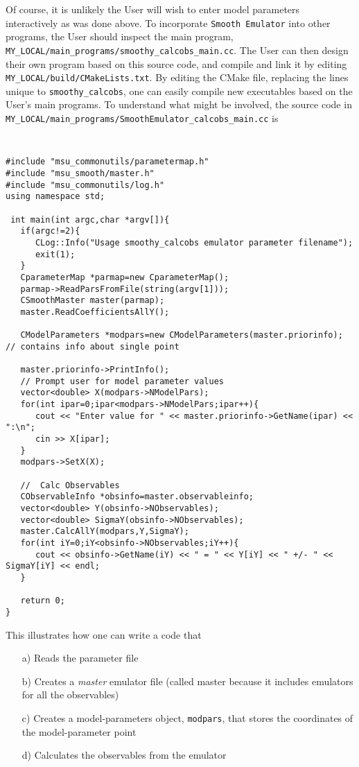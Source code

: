 \documentclass[UserManual.tex]{subfiles}
\begin{document}
Of course, it is unlikely the User will wish to enter model parameters interactively as was done above. To incorporate {\tt Smooth Emulator} into other programs, the User should inspect the main program, {\tt MY\_LOCAL/main\_programs/smoothy\_calcobs\_main.cc}. The User can then design their own program based on this source code, and compile and link it by editing {\tt MY\_LOCAL/build/CMakeLists.txt}. By editing the CMake file, replacing the lines unique to {\tt smoothy\_calcobs}, one can easily compile new executables based on the User's main programs. To understand what might be involved, the source code in {\tt MY\_LOCAL/main\_programs/SmoothEmulator\_calcobs\_main.cc} is
{\tt
\begin{verbatim}
#include "msu_commonutils/parametermap.h"
#include "msu_smooth/master.h"
#include "msu_commonutils/log.h"
using namespace std;

 int main(int argc,char *argv[]){
   if(argc!=2){
      CLog::Info("Usage smoothy_calcobs emulator parameter filename");
      exit(1);
   }
   CparameterMap *parmap=new CparameterMap();
   parmap->ReadParsFromFile(string(argv[1]));
   CSmoothMaster master(parmap);
   master.ReadCoefficientsAllY();
   
   CModelParameters *modpars=new CModelParameters(master.priorinfo); // contains info about single point
   
   master.priorinfo->PrintInfo();
   // Prompt user for model parameter values
   vector<double> X(modpars->NModelPars);
   for(int ipar=0;ipar<modpars->NModelPars;ipar++){
      cout << "Enter value for " << master.priorinfo->GetName(ipar) << ":\n";
      cin >> X[ipar];
   }
   modpars->SetX(X);
   
   //  Calc Observables
   CObservableInfo *obsinfo=master.observableinfo;
   vector<double> Y(obsinfo->NObservables);
   vector<double> SigmaY(obsinfo->NObservables);
   master.CalcAllY(modpars,Y,SigmaY);
   for(int iY=0;iY<obsinfo->NObservables;iY++){
      cout << obsinfo->GetName(iY) << " = " << Y[iY] << " +/- " << SigmaY[iY] << endl;
   }

   return 0;
}
\end{verbatim}
}
This illustrates how one can write a code that 
\begin{itemize}\itemsep=0pt
\item[a)] Reads the parameter file
\item[b)] Creates a {\it master} emulator file (called master because it includes emulators for all the observables)
\item[c)] Creates a model-parameters object, {\tt modpars}, that stores the coordinates of the model-parameter point
\item[d)] Calculates the observables from the emulator
\end{itemize}
\end{document}
